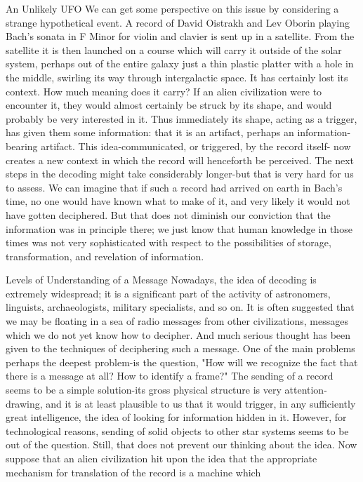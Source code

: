                                     An Unlikely UFO
        We can get some perspective on this issue by considering a strange hypothetical
event. A record of David Oistrakh and Lev Oborin playing Bach's sonata in F Minor for
violin and clavier is sent up in a satellite. From the satellite it is then launched on a course
which will carry it outside of the solar system, perhaps out of the entire galaxy just a thin
plastic platter with a hole in the middle, swirling its way through intergalactic space. It
has certainly lost its context. How much meaning does it carry?
        If an alien civilization were to encounter it, they would almost certainly be struck
by its shape, and would probably be very interested in it. Thus immediately its shape,
acting as a trigger, has given them some information: that it is an artifact, perhaps an
information-bearing artifact. This idea-communicated, or triggered, by the record itself-
now creates a new context in which the record will henceforth be perceived. The next
steps in the decoding might take considerably longer-but that is very hard for us to assess.
We can imagine that if such a record had arrived on earth in Bach's time, no one would
have known what to make of it, and very likely it would not have gotten deciphered. But
that does not diminish our conviction that the information was in principle there; we just
know that human knowledge in those times was not very sophisticated with respect to the
possibilities of storage, transformation, and revelation of information.

                      Levels of Understanding of a Message
Nowadays, the idea of decoding is extremely widespread; it is a significant part of the
activity of astronomers, linguists, archaeologists, military specialists, and so on. It is
often suggested that we may be floating in a sea of radio messages from other
civilizations, messages which we do not yet know how to decipher. And much serious
thought has been given to the techniques of deciphering such a message. One of the main
problems perhaps the deepest problem-is the question, "How will we recognize the fact
that there is a message at all? How to identify a frame?" The sending of a record seems to
be a simple solution-its gross physical structure is very attention-drawing, and it is at
least plausible to us that it would trigger, in any sufficiently great intelligence, the idea of
looking for information hidden in it. However, for technological reasons, sending of solid
objects to other star systems seems to be out of the question. Still, that does not prevent
our thinking about the idea.
        Now suppose that an alien civilization hit upon the idea that the appropriate
mechanism for translation of the record is a machine which




